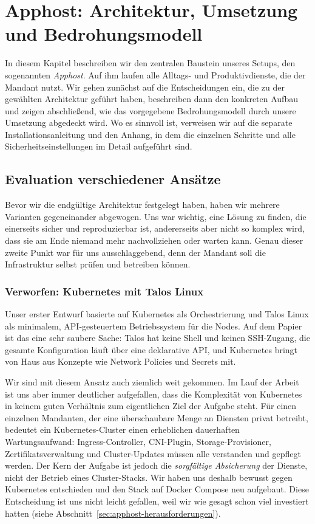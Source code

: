 \section{Apphost: Architektur, Umsetzung und Bedrohungsmodell} \label{Apphost}

In diesem Kapitel beschreiben wir den zentralen Baustein unseres Setups, den
sogenannten \emph{Apphost}. Auf ihm laufen alle Alltags- und Produktivdienste,
die der Mandant nutzt. Wir gehen zunächst auf die Entscheidungen ein, die zu
der gewählten Architektur geführt haben, beschreiben dann den konkreten
Aufbau und zeigen abschließend, wie das vorgegebene Bedrohungsmodell durch
unsere Umsetzung abgedeckt wird. Wo es sinnvoll ist, verweisen wir auf die
separate Installationsanleitung und den Anhang, in dem die einzelnen Schritte und alle
Sicherheitseinstellungen im Detail aufgeführt sind.

\subsection{Evaluation verschiedener Ansätze}

Bevor wir die endgültige Architektur festgelegt haben, haben wir mehrere
Varianten gegeneinander abgewogen. Uns war wichtig, eine Lösung zu finden,
die einerseits sicher und reproduzierbar ist, andererseits aber nicht so
komplex wird, dass sie am Ende niemand mehr nachvollziehen oder warten kann.
Genau dieser zweite Punkt war für uns ausschlaggebend, denn der Mandant soll
die Infrastruktur selbst prüfen und betreiben können.

\subsubsection*{Verworfen: Kubernetes mit Talos Linux}

Unser erster Entwurf basierte auf Kubernetes als Orchestrierung und Talos
Linux als minimalem, \ac{API}-gesteuertem Betriebssystem für die Nodes. Auf dem
Papier ist das eine sehr saubere Sache: Talos hat keine Shell und keinen
\ac{SSH}-Zugang, die gesamte Konfiguration läuft über eine deklarative \ac{API}, und
Kubernetes bringt von Haus aus Konzepte wie Network Policies und Secrets mit.

Wir sind mit diesem Ansatz auch ziemlich weit gekommen. Im Lauf der Arbeit
ist uns aber immer deutlicher aufgefallen, dass die Komplexität von Kubernetes
in keinem guten Verhältnis zum eigentlichen Ziel der Aufgabe steht. Für einen
einzelnen Mandanten, der eine überschaubare Menge an Diensten privat betreibt,
bedeutet ein Kubernetes-Cluster einen erheblichen dauerhaften Wartungsaufwand:
Ingress-Controller, \ac{CNI}-Plugin, Storage-Provisioner, Zertifikatsverwaltung und
Cluster-Updates müssen alle verstanden und gepflegt werden. Der Kern der
Aufgabe ist jedoch die \emph{sorgfältige Absicherung} der Dienste, nicht der
Betrieb eines Cluster-Stacks. Wir haben uns deshalb bewusst gegen Kubernetes
entschieden und den Stack auf Docker Compose neu aufgebaut. Diese Entscheidung
ist uns nicht leicht gefallen, weil wir wie gesagt schon viel investiert hatten
(siehe Abschnitt~\ref{sec:apphost-herausforderungen}).

